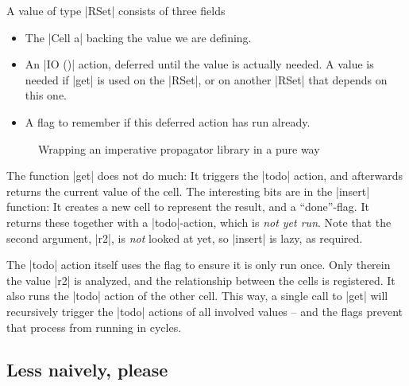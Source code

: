 \documentclass[manuscript,anonymous,screen,acmsmall]{acmart}
\begin{document}
A value of type |RSet| consists of three fields
\begin{itemize}
\item The |Cell a| backing the value we are defining.
\item An |IO ()| action, deferred until the value is actually needed. A value is needed if |get| is used on the |RSet|, or on another |RSet| that depends on this one.
\item A flag to remember if this deferred action has run already.
\end{itemize}


\begin{figure}%
\setlength{\abovedisplayskip}{0pt}%
\setlength{\belowdisplayskip}{0pt}%
\raggedright%
%
\caption{Wrapping an imperative propagator library in a pure way}\label{fig:wrap}
\end{figure}

The function |get| does not do much: It triggers the |todo| action, and afterwards returns the current value of the cell. The interesting bits are in the |insert| function: It creates a new cell to represent the result, and a “done”-flag. It returns these together with a |todo|-action, which is \emph{not yet run}. Note that the second argument, |r2|, is \emph{not} looked at yet, so |insert| is lazy, as required.

The |todo| action itself uses the flag to ensure it is only run once. Only therein the value |r2| is analyzed, and the relationship between the cells is registered. It also runs the |todo| action of the other cell. This way, a single call to |get| will recursively trigger the |todo| actions of all involved values -- and the flags prevent that process from running in cycles.

\subsection{Less naively, please}
\end{document}
